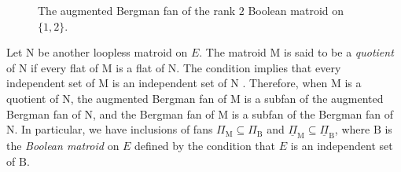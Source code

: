 \documentclass[11pt,reqno]{amsart}
\theoremstyle{definition}
\theoremstyle{remark}
\renewcommand{\(}{\left(}
\renewcommand{\)}{\right)}
\newcommand{\<}{\left<}
\renewcommand{\>}{\right>}
\begin{document}
\begin{figure}[h]
\caption{The augmented Bergman fan of the rank $2$ Boolean matroid on $\{1,2\}$.}
\end{figure}

Let $\mathrm{N}$ be another loopless matroid on $E$.
The matroid $\mathrm{M}$ is said to be a \emph{quotient} of $\mathrm{N}$ if every flat of $\mathrm{M}$ is a flat of $\mathrm{N}$.
The condition implies that every independent set of $\mathrm{M}$ is an independent set of $\mathrm{N}$ \cite[Proposition 8.1.6]{Kung}.
Therefore, 
when $\mathrm{M}$ is a quotient of  $\mathrm{N}$, 
the augmented Bergman fan of $\mathrm{M}$ is a subfan of the augmented Bergman fan of $\mathrm{N}$,
and the  Bergman fan of $\mathrm{M}$ is a subfan of the Bergman fan of $\mathrm{N}$.
In particular, %
we have inclusions of fans
 $\Pi_\mathrm{M} \subseteq \Pi_{\mathrm{B}}$
and  $\underline{\Pi}_\mathrm{M} \subseteq \underline{\Pi}_{\mathrm{B}}$,
where $\mathrm{B}$ is the \emph{Boolean matroid} on $E$ defined by the condition that $E$ is an independent set of $\mathrm{B}$.
\end{document}
